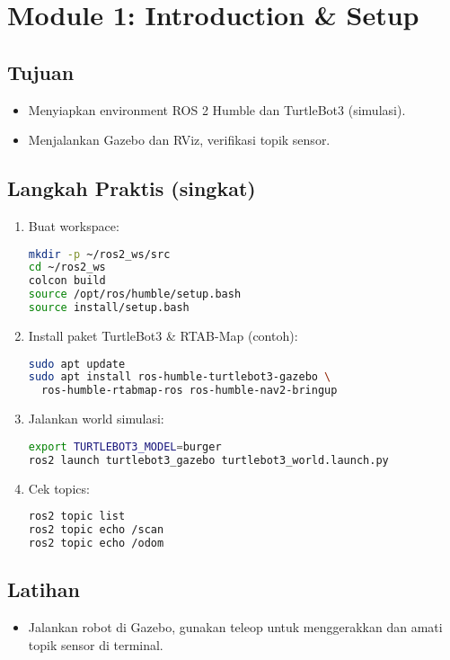 \documentclass[12pt,a4paper]{article}
\begin{document}
\newpage
\section{Module 1: Introduction \& Setup}
\subsection*{Tujuan}
\begin{itemize}
    \item Menyiapkan environment ROS 2 Humble dan TurtleBot3 (simulasi).
    \item Menjalankan Gazebo dan RViz, verifikasi topik sensor.
\end{itemize}

\subsection*{Langkah Praktis (singkat)}
\begin{enumerate}
    \item Buat workspace:
          \begin{lstlisting}[language=bash]
mkdir -p ~/ros2_ws/src
cd ~/ros2_ws
colcon build
source /opt/ros/humble/setup.bash
source install/setup.bash
\end{lstlisting}
    \item Install paket TurtleBot3 \& RTAB-Map (contoh):
          \begin{lstlisting}[language=bash]
sudo apt update
sudo apt install ros-humble-turtlebot3-gazebo \
  ros-humble-rtabmap-ros ros-humble-nav2-bringup
\end{lstlisting}
    \item Jalankan world simulasi:
          \begin{lstlisting}[language=bash]
export TURTLEBOT3_MODEL=burger
ros2 launch turtlebot3_gazebo turtlebot3_world.launch.py
\end{lstlisting}
    \item Cek topics:
          \begin{lstlisting}[language=bash]
ros2 topic list
ros2 topic echo /scan
ros2 topic echo /odom
\end{lstlisting}
\end{enumerate}

\subsection*{Latihan}
\begin{itemize}
    \item Jalankan robot di Gazebo, gunakan teleop untuk menggerakkan dan amati topik sensor di terminal.
\end{itemize}
\end{document}
